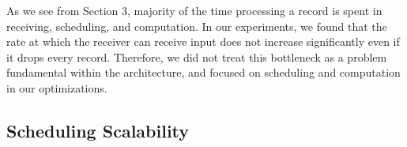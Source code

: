 As we see from Section 3, majority of the time processing a record is spent in receiving, scheduling, and computation. In our experiments, we found that the rate at which the receiver can receive input does not increase significantly even if it drops every record. Therefore, we did not treat this bottleneck as a problem fundamental within the architecture, and focused on scheduling and computation in our optimizations.

\subsection{Scheduling Scalability}

%
%
%

